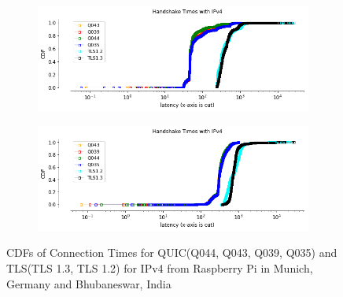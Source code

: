 \begin{frame}
\begin{figure}[!htb]
    
    \begin{subfigure}{0.45\textwidth}
        \includegraphics[width=\linewidth]{./plots/PI/handshake_times_ipv4.png}
    \end{subfigure}
    
%
    
    \begin{subfigure}{0.45\textwidth}
        \includegraphics[width=\linewidth]{./plots/India/handshake_times_ipv4.png}
    \end{subfigure}
    
    \caption{CDFs of Connection Times for QUIC(Q044, Q043, Q039, Q035) and TLS(TLS 1.3, TLS 1.2) for IPv4 from Raspberry Pi in Munich, Germany and Bhubaneswar, India}\label{fig:cdfs-of-connectionm}
\end{figure}


\end{frame}
\clearpage

